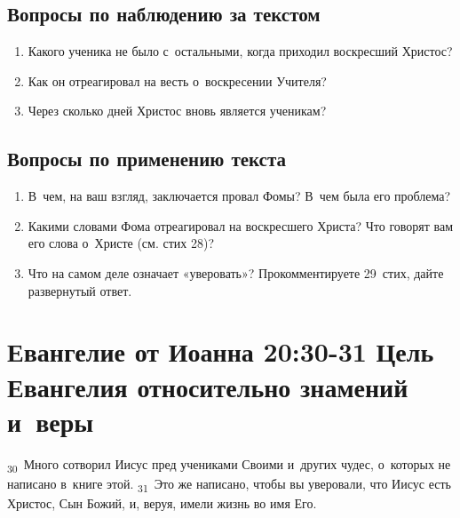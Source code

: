 \documentclass[a4paper,12pt]{article}
\begin{document}
\subsection*{Вопросы по наблюдению за текстом}
\begin{enumerate}
    \item Какого ученика не было с~остальными, когда приходил воскресший Христос? 
    
    \myline
    
    \myline
    \item Как он отреагировал на весть о~воскресении Учителя? 
    
    \myline
    
    \myline
    \item Через сколько дней Христос вновь является ученикам? 
    
    \myline
    
    \myline
\end{enumerate}

\subsection*{Вопросы по применению текста} 
\begin{enumerate}
    \item В~чем, на ваш взгляд, заключается провал Фомы? В~чем была его проблема?
    
    \myline
    
    \myline
    \item Какими словами Фома отреагировал на воскресшего Христа? Что говорят вам его слова о~Христе (см. стих 28)? 
    
    \myline
    
    \myline
    \item Что на самом деле означает «уверовать»? Прокомментируете 29~стих, дайте развернутый ответ.
    
    \myline
    
    \myline
\end{enumerate}



\section{Евангелие от Иоанна 20:30-31 Цель Евангелия относительно знамений и~веры}

\textsubscript{30}~Много сотворил Иисус пред учениками Своими и~других чудес, о~которых не написано в~книге этой. \textsubscript{31}~Это же написано, чтобы вы уверовали, что Иисус есть Христос, Сын Божий, и, веруя, имели жизнь во имя Его. 
\end{document}
